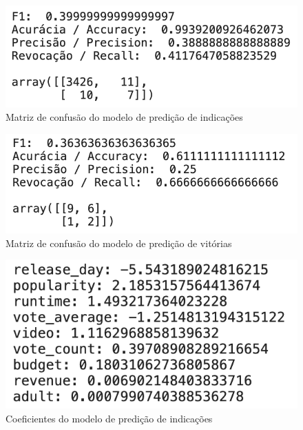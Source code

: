             \begin{figure}[htb]
            	\caption{\label{confusao_1}Matriz de confusão do modelo de predição de indicações}
            	\begin{center}
            		\includegraphics[scale=0.7]{confusao_1.png}
            	\end{center}
            \end{figure}
            
            \begin{figure}[htb]
            	\caption{\label{confusao_2}Matriz de confusão do modelo de predição de vitórias}
            	\begin{center}
            		\includegraphics[scale=0.7]{confusao_2.png}
            	\end{center}
            \end{figure}
            
            \begin{figure}[htb]
            	\caption{\label{coefs_1}Coeficientes do modelo de predição de indicações}
            	\begin{center}
            		\includegraphics[scale=0.7]{coefs_1.png}
            	\end{center}
            \end{figure}
            
